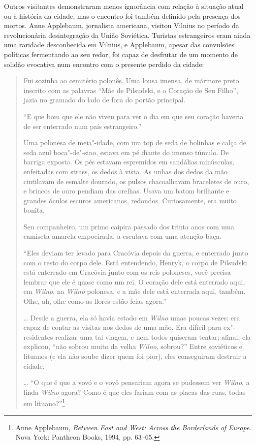 Outros visitantes demonstraram menos ignorância com relação à situação
atual ou à história da cidade, mas o encontro foi também definido pela
presença dos mortos. Anne Applebaum, jornalista americana, visitou
Vilnius no período da revolucionária desintegração da União Soviética.
Turistas estrangeiros eram ainda uma raridade desconhecida em Vilnius, e
Applebaum, apesar das convulsões políticas fermentando ao seu redor, foi
capaz de desfrutar de um momento de solidão evocativa num encontro com o
presente perdido da cidade:

\begin{quote}
Fui sozinha ao cemitério polonês. Uma lousa imensa, de mármore preto
inscrito com as palavras ``Mãe de Pilsudski, e o Coração de Seu Filho'',
jazia no gramado do lado de fora do portão principal.

``E que bom que ele não viveu para ver o dia em que seu coração haveria
de ser enterrado num país estrangeiro.''

Uma polonesa de meia"-idade, com um top de seda de bolinhas e calça de
seda azul boca"-de"-sino, estava em pé diante do imenso túmulo. De barriga
exposta. Os pés estavam espremidos em sandálias minúsculas, enfeitadas
com strass, os dedos à vista. As unhas dos dedos da mão cintilavam de
esmalte dourado, os pulsos chacoalhavam braceletes de ouro, e brincos de
ouro pendiam das orelhas. Usava um batom brilhante e grandes óculos
escuros americanos, redondos. Curiosamente, era muito bonita.

Seu companheiro, um primo caipira passado dos trinta anos com uma
camiseta amarela empoeirada, a escutava com uma atenção baça.

``Eles deviam ter levado para Cracóvia depois da guerra, e enterrado
junto com o resto do corpo dele. Está entendendo, Henryk, o corpo de
Pilsudski está enterrado em Cracóvia junto com os reis poloneses, você
precisa lembrar que ele é quase como um rei. O coração dele está
enterrado aqui, em \textit{Wilno}, na \textit{Wilno} polonesa, e a mãe dele está enterrada
aqui, também. Olhe, ah, olhe como as flores estão feias agora.''

\ldots{} Desde a guerra, ela só havia estado em \textit{Wilno} umas poucas vezes:
era capaz de contar as visitas nos dedos de uma mão. Era difícil para
ex"-residentes realizar uma tal viagem, e nem todos quiseram tentar;
afinal, ela explicou, ``não sobrou muito da velha \textit{Wilno}, sobrou?'' Entre
soviéticos e lituanos (e ela não soube dizer quem foi pior), eles
conseguiram destruir a cidade.

\ldots{} ``O que é que a vovó e o vovô pensariam agora se pudessem ver
\textit{Wilno}, a linda \textit{Wilno} agora? Como é que eles fariam com as placas das
ruas, todas em lituano?''\footnote{Anne Applebaum, \textit{Between East and West: Across the Borderlands of Europe}. Nova York: Pantheon Books, 1994, pp. 63--65.}
\end{quote}

